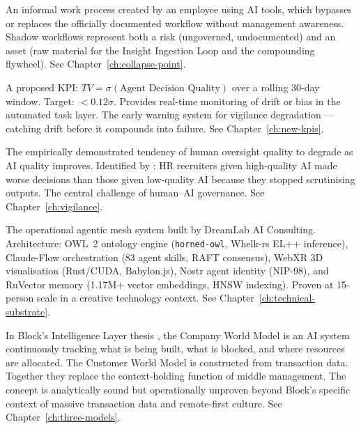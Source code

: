 \begin{description}[style=nextline, leftmargin=2em, font=\bfseries\color{navyblue}]
\item[Shadow Workflow]
An informal work process created by an employee using AI tools, which bypasses or replaces the officially documented workflow without management awareness. Shadow workflows represent both a risk (ungoverned, undocumented) and an asset (raw material for the Insight Ingestion Loop and the compounding flywheel). See Chapter~\ref{ch:collapse-point}.

\item[Trust Variance (TV)]
A proposed KPI: $TV = \sigma(\text{Agent Decision Quality})$ over a rolling 30-day window. Target: $<0.12\sigma$. Provides real-time monitoring of drift or bias in the automated task layer. The early warning system for vigilance degradation --- catching drift before it compounds into failure. See Chapter~\ref{ch:new-kpis}.

\item[Vigilance Problem]
The empirically demonstrated tendency of human oversight quality to degrade as AI quality improves. Identified by \textcite{DellAcqua2023}: HR recruiters given high-quality AI made worse decisions than those given low-quality AI because they stopped scrutinising outputs. The central challenge of human--AI governance. See Chapter~\ref{ch:vigilance}.

\item[VisionClaw]
The operational agentic mesh system built by DreamLab AI Consulting. Architecture: OWL~2 ontology engine (\texttt{horned-owl}, Whelk-rs EL++ inference), Claude-Flow orchestration (83 agent skills, RAFT consensus), WebXR 3D visualisation (Rust/CUDA, Babylon.js), Nostr agent identity (NIP-98), and RuVector memory (1.17M+ vector embeddings, HNSW indexing). Proven at 15-person scale in a creative technology context. See Chapter~\ref{ch:technical-substrate}.

\item[World Model]
In Block's Intelligence Layer thesis \parencite{DorseyBotha2026}, the Company World Model is an AI system continuously tracking what is being built, what is blocked, and where resources are allocated. The Customer World Model is constructed from transaction data. Together they replace the context-holding function of middle management. The concept is analytically sound but operationally unproven beyond Block's specific context of massive transaction data and remote-first culture. See Chapter~\ref{ch:three-models}.

\end{description}
